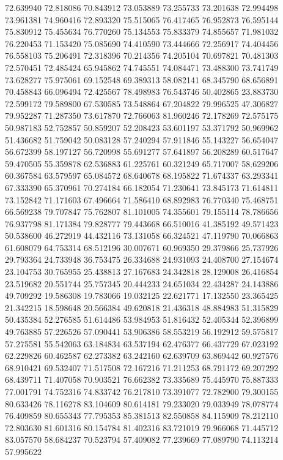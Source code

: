 72.639940
72.818086
70.843912
73.053889
73.255733
73.201638
72.994498
73.961381
74.960416
72.893320
75.515065
76.417465
76.952873
76.595144
75.830912
75.455634
76.770260
75.134553
75.833379
74.855657
71.981032
76.220453
71.153420
75.085690
74.410590
73.444666
72.256917
74.404456
76.558103
75.206491
72.318396
70.214356
74.205104
70.697821
70.481303
72.570451
72.485424
65.945862
74.745551
74.084471
73.488300
73.741749
73.628277
75.975061
69.152548
69.389313
58.082141
68.345790
68.656891
70.458843
66.096494
72.425567
78.498983
76.543746
50.402865
23.883730
72.599172
79.589800
67.530585
73.548864
67.204822
79.996525
47.306827
79.952287
71.287350
73.617870
72.766063
81.960246
72.178269
72.575175
50.987183
52.752857
50.859207
52.208423
53.601197
53.371792
50.969962
51.436682
51.759042
50.083128
57.240294
57.911846
55.143227
56.654047
56.672399
58.197127
56.720998
55.691277
57.641897
56.208289
60.517647
59.470505
55.359878
62.536883
61.225761
60.321249
65.717007
58.629206
60.367584
63.579597
65.084572
68.640678
68.195822
71.674337
63.293341
67.333390
65.370961
70.274184
66.182054
71.230641
73.845173
71.614811
73.152842
71.171603
67.496664
71.586410
68.892983
76.770340
75.468751
66.569238
79.707847
75.762807
81.101005
74.355601
79.155114
78.786656
76.937798
81.171384
79.828777
79.443668
66.510016
41.385192
49.571423
50.538600
46.272919
44.432116
73.131058
66.324521
47.119790
70.066863
61.608079
64.753314
68.512196
30.007671
60.969350
29.379866
25.737926
29.793364
24.733948
36.753475
26.334688
24.931093
24.408700
27.154674
23.104753
30.765955
25.438813
27.167683
24.342818
28.129008
26.416854
23.519682
20.551744
25.757345
20.444233
24.651034
22.434287
24.143886
49.709292
19.586308
19.783066
19.032125
22.621771
17.132550
23.365425
21.342215
18.598648
20.566384
49.620818
21.436318
48.884983
51.315829
50.435384
52.276585
51.614486
53.984953
51.816432
52.405344
52.396899
49.763885
57.226526
57.090441
53.906386
58.553219
56.192912
59.575817
57.275581
55.542063
63.184834
63.537194
62.476377
66.437729
67.023192
62.229826
60.462587
62.273382
63.242160
62.639709
63.869442
60.927576
68.910421
69.532407
71.517508
72.167216
71.211253
68.791172
69.207292
68.439711
71.407058
70.903521
76.662382
73.335689
75.445970
75.887333
77.001791
74.752316
74.833742
76.217810
73.391077
72.782900
79.300155
80.633426
78.116278
83.104609
80.614181
79.233020
79.033949
78.078774
76.409859
80.655343
77.795353
85.381513
82.550858
84.115909
78.212110
72.803630
81.601316
80.154784
81.402316
83.721019
79.966068
71.445712
83.057570
58.684237
70.523794
57.409082
77.239669
77.089790
74.113214
57.995622
